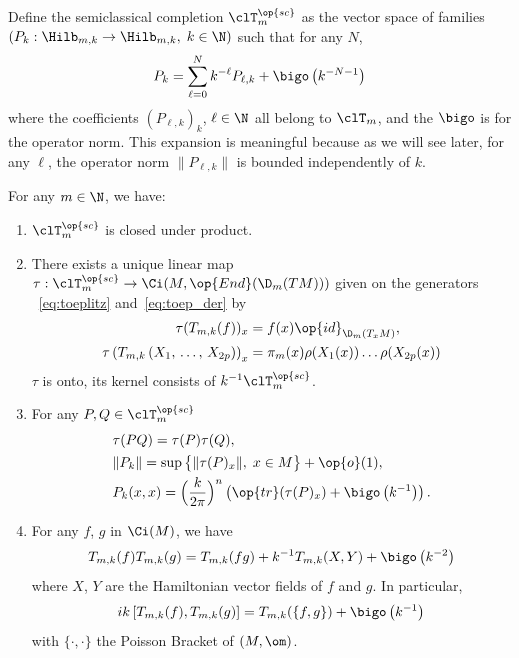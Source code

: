 Define the semiclassical completion $\clT_m ^{\op{sc}}$ as the vector space of families $(P_k : \Hilb_{m,k} \rightarrow \Hilb_{m,k}, \; k \in
\N)$ such that for any $N$,
\[
P_k = \sum_{\ell= 0 } ^N k^{-\ell} P_{\ell,k} + \bigo \left(k ^{-N-1}\right)
\]
where the coefficients $(P_{\ell, k })_k$, $\ell \in \N$ all belong to $\clT_m$, and the $\bigo $ is for the operator norm. This expansion is meaningful because as we will see later, for any $\ell$, the operator norm $\| P_{\ell, k}\|$ is bounded independently of $k$.



\begin{theo}\label{theo:Toeplitz_Landau}
For any $m \in \N$, we have:
\begin{enumerate}
\item\label{theo1.3.1} $ \clT_m^{\op{sc}}$ is closed under product.
\item\label{theo1.3.2}  There exists a unique linear map $ \mathcal{\tau} : \clT_m^{\op{sc}} \rightarrow \Ci (M,
\op{End} (\D_m (TM))) $ given on the generators ~\eqref{eq:toeplitz} and~\eqref{eq:toep_der} by
\begin{equation}\label{eq:symbolmap}
\begin{split}
\tau (T_{m,k} (f))_x & = f(x) \op{id}_{\D_m (T_x M)}, \\ \tau \left(T_{m,k} \left(X_1,\, \ldots,\, X_{2p}\right)\right)_x & = \pi_m(x) \rho(X_1(x))
\ldots \rho (X_{2p}(x))
\end{split}
\end{equation}
$\tau$ is onto, its kernel consists of $k^{-1} \clT_{m}^{\op{sc}}$.
\item\label{theo1.3.3} For any $P,Q \in \clT_{m}^{\op{sc}}$
\begin{align}
 &\tau (PQ) = \tau (P) \tau (Q),\label{eq:prod} \\
 &\| P_k \| = \sup \big\{ \| \tau (P)_x \|, \; x \in M \big\} + \op{o} (1),  \label{eq:norm}\\ 
 &P_k(x,x) = \Bigl(\frac{k}{2\pi} \Bigr)^n \left(\op{tr} (\tau (P)_x) + \bigo \left(k^{-1}\right)\right).\label{eq:trace}
\end{align}
\item\label{theo1.3.4} For any $f$, $g$ in $\Ci (M)$, we have
\begin{gather}\label{eq:produit}
T_{m,k} (f) T_{m,k} (g) = T_{m,k} (fg) + k^{-1} T_{m,k} (X,Y) + \bigo \left(k^{-2}\right)
\end{gather}
where $X$, $Y$ are the Hamiltonian vector fields of $f$ and $g$. In particular,
\begin{gather}\label{eq:com_poisson}
ik \left[T_{m,k} (f), T_{m,k} (g)\right] = T_{m,k} (\{ f,g \}) + \bigo \left(k^{-1}\right)
\end{gather}
with $\{ \cdot, \cdot \}$ the Poisson Bracket of $(M, \om)$.
\end{enumerate}
\end{theo}


